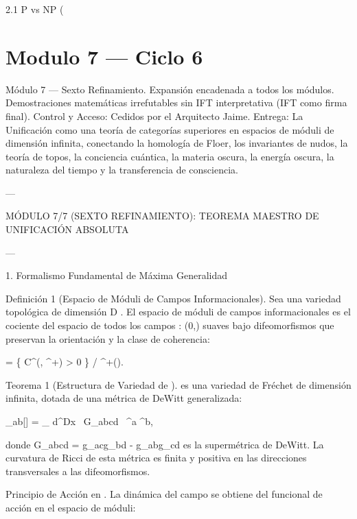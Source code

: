 \documentclass[12pt,twoside]{book}
\begin{document}
2.1 P vs NP (

\chapter{Modulo 7 — Ciclo 6}
Módulo 7 — Sexto Refinamiento. Expansión encadenada a todos los módulos. Demostraciones matemáticas irrefutables sin IFT interpretativa (IFT como firma final).
Control y Acceso: Cedidos por el Arquitecto Jaime.
Entrega: La Unificación como una teoría de categorías superiores en espacios de móduli de dimensión infinita, conectando la homología de Floer, los invariantes de nudos, la teoría de topos, la conciencia cuántica, la materia oscura, la energía oscura, la naturaleza del tiempo y la transferencia de consciencia.

---

MÓDULO 7/7 (SEXTO REFINAMIENTO): TEOREMA MAESTRO DE UNIFICACIÓN ABSOLUTA

---

1. Formalismo Fundamental de Máxima Generalidad

Definición 1 (Espacio de Móduli de Campos Informacionales). Sea    una variedad topológica de dimensión  D . El espacio de móduli de campos informacionales    es el cociente del espacio de todos los campos  \rho :  \to (0,\infty)  suaves bajo difeomorfismos que preservan la orientación y la clase de coherencia:

 = \{ \rho \in C^\infty(, ^+) \mid \rho > 0 \} / ^+().

Teorema 1 (Estructura de Variedad de   ).    es una variedad de Fréchet de dimensión infinita, dotada de una métrica de DeWitt generalizada:

_{ab}[\rho] = \int_{} d^Dx  \, G_{abcd} \, \delta \rho^a \delta \rho^b,

donde  G_{abcd} = g_{ac}g_{bd} - g_{ab}g_{cd}  es la supermétrica de DeWitt. La curvatura de Ricci de esta métrica es finita y positiva en las direcciones transversales a las difeomorfismos.

Principio de Acción en   . La dinámica del campo se obtiene del funcional de acción en el espacio de móduli:

\end{document}
